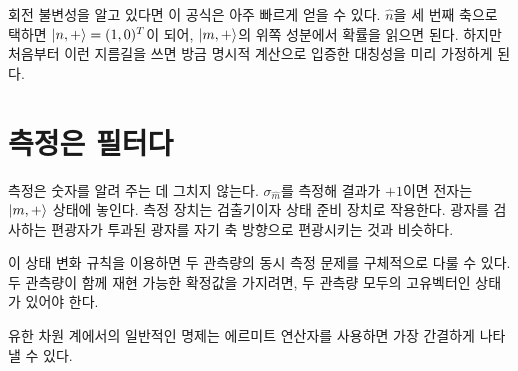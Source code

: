 회전 불변성을 알고 있다면 이 공식은 아주 빠르게 얻을 수 있다. \(\hat n\)을 세 번째 축으로 택하면 \(\left\lvert n,+\right\rangle=(1,0)^T\)이 되어, \(\left\lvert m,+\right\rangle\)의 위쪽 성분에서 확률을 읽으면 된다. 하지만 처음부터 이런 지름길을 쓰면 방금 명시적 계산으로 입증한 대칭성을 미리 가정하게 된다.

\begin{classroomqa}
\end{classroomqa}

\begin{classroomqa}
\end{classroomqa}

\section{측정은 필터다}

측정은 숫자를 알려 주는 데 그치지 않는다. \(\sigma_{\hat m}\)를 측정해 결과가 \(+1\)이면 전자는 \(\left\lvert m,+\right\rangle\) 상태에 놓인다. 측정 장치는 검출기이자 상태 준비 장치로 작용한다. 광자를 검사하는 편광자가 투과된 광자를 자기 축 방향으로 편광시키는 것과 비슷하다.

이 상태 변화 규칙을 이용하면 두 관측량의 동시 측정 문제를 구체적으로 다룰 수 있다. 두 관측량이 함께 재현 가능한 확정값을 가지려면, 두 관측량 모두의 고유벡터인 상태가 있어야 한다.

\begin{classroomqa}
\end{classroomqa}

유한 차원 계에서의 일반적인 명제는 에르미트 연산자를 사용하면 가장 간결하게 나타낼 수 있다.

